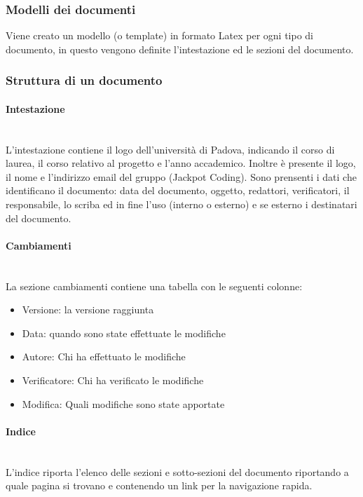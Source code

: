 \documentclass{article}
\begin{document}
\subsubsection{Modelli dei documenti}
Viene creato un modello (o template) in formato Latex per ogni tipo di documento, in questo vengono definite l'intestazione ed le sezioni del documento.

\subsubsection{Struttura di un documento}

\paragraph{Intestazione}~\\
L'intestazione contiene il logo dell'università di Padova, indicando il corso di laurea, il corso relativo al progetto e l'anno accademico. Inoltre è presente il logo, il nome e l'indirizzo email del gruppo (Jackpot Coding).
Sono prensenti i dati che identificano il documento: data del documento, oggetto, redattori, verificatori, il responsabile, lo scriba ed in fine l'uso (interno o esterno) e se esterno i destinatari del documento.

\paragraph{Cambiamenti}~\\
La sezione cambiamenti contiene una tabella con le seguenti colonne:
\begin{itemize}
    \item Versione: la versione raggiunta
    \item Data: quando sono state effettuate le modifiche
    \item Autore: Chi ha effettuato le modifiche
    \item Verificatore: Chi ha verificato le modifiche
    \item Modifica: Quali modifiche sono state apportate
\end{itemize}

\paragraph{Indice}~\\
L'indice riporta l'elenco delle sezioni e sotto-sezioni del documento riportando a quale pagina si trovano e contenendo un link per la navigazione rapida.
\end{document}
